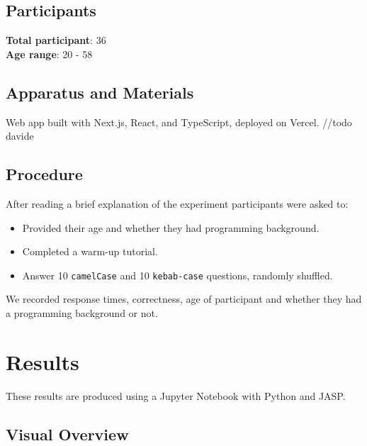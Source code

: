 \documentclass[unicode,11pt,a4paper,oneside,numbers=endperiod,openany]{scrartcl}
\begin{document}
\subsection{Participants}
\textbf{Total participant}: 36 \\
\textbf{Age range}: 20 - 58 \\

\subsection{Apparatus and Materials}
Web app built with Next.js, React, and TypeScript, deployed on Vercel. //todo davide

\subsection{Procedure}
After reading a brief explanation of the experiment participants were asked to:
\begin{itemize}
    \item Provided their age and whether they had programming background.
    \item Completed a warm-up tutorial.
    \item Answer 10 \texttt{camelCase} and 10 \texttt{kebab-case} questions, randomly shuffled.
\end{itemize}

We recorded response times, correctness, age of participant and whether they had a programming background or not.

\section{Results}
These results are produced using a Jupyter Notebook with Python and JASP.

\subsection{Visual Overview}
\end{document}
